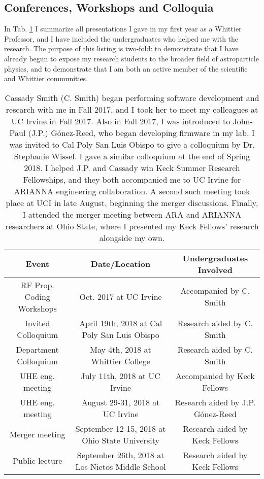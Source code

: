 \documentclass[../../main.tex]{subfiles}
\begin{document}
\subsection{Conferences, Workshops and Colloquia}

In Tab. \ref{tab:conf} I summarize all presentations I gave in my first year as a Whittier Professor, and I have included the undergraduates who helped me with the research.  The purpose of this listing is two-fold: to demonstrate that I have already begun to expose my research students to the broader field of astroparticle physics, and to demonstrate that I am both an active member of the scientific and Whittier communities.

\begin{table}
\small
\centering
\begin{tabular}{|c|c|c|}
\hline \hline
Event & Date/Location & Undergraduates Involved \\ \hline
RF Prop. Coding Workshops & Oct. 2017 at UC Irvine & Accompanied by C. Smith \\ \hline
Invited Colloquium & April 19th, 2018 at Cal Poly San Luis Obispo & Research aided by C. Smith \\ \hline
Department Colloquium & May 4th, 2018 at Whittier College & Research aided by C. Smith \\ \hline
UHE eng. meeting & July 11th, 2018 at UC Irvine & Accompanied by Keck Fellows \\ \hline
UHE eng. meeting & August 29-31, 2018 at UC Irvine & Research aided by J.P. G\'{o}nez-Reed \\ \hline
Merger meeting & September 12-15, 2018 at Ohio State University & Research aided by Keck Fellows \\ \hline
Public lecture & September 26th, 2018 at Los Nietos Middle School & Research aided by Keck Fellows \\ \hline
\hline
\end{tabular}
\caption{\label{tab:conf} Cassady Smith (C. Smith) began performing software development and research with me in Fall 2017, and I took her to meet my colleagues at UC Irvine in Fall 2017. Also in Fall 2017, I was introduced to John-Paul (J.P.) G\'{o}nez-Reed, who began developing firmware in my lab.  I was invited to Cal Poly San Luis Obispo to give a colloquium by Dr. Stephanie Wissel.  I gave a similar colloquium at the end of Spring 2018.  I helped J.P. and Cassady win Keck Summer Research Fellowships, and they both accompanied me to UC Irvine for ARIANNA engineering collaboration.  A second such meeting took place at UCI in late August, beginning the merger discussions.  Finally, I attended the merger meeting between ARA and ARIANNA researchers at Ohio State, where I presented my Keck Fellows' research alongside my own.}
\end{table}
\end{document}
